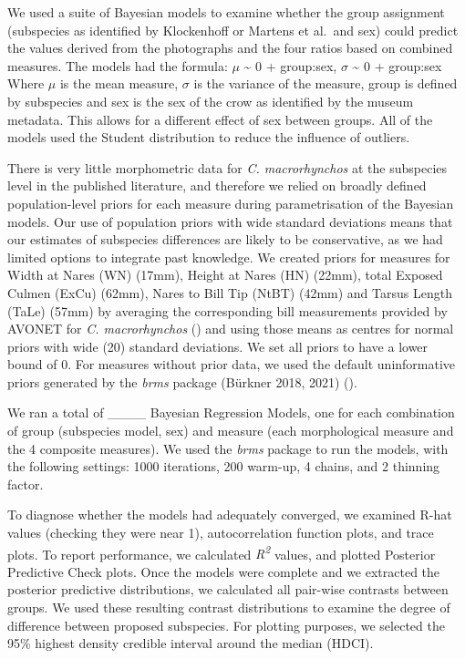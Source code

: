 \documentclass[10pt,a4paper]{article}
\begin{document}
We used a suite of Bayesian models to examine whether the group assignment (subspecies as identified by Klockenhoff or Martens et al.~and sex) could predict the values derived from the photographs and the four ratios based on combined measures.
The models had the formula: \(\mu\) \textasciitilde{} 0 + group:sex, \(\sigma\) \textasciitilde{} 0 + group:sex
Where \(\mu\) is the mean measure, \(\sigma\) is the variance of the measure, group is defined by subspecies and sex is the sex of the crow as identified by the museum metadata.
This allows for a different effect of sex between groups.
All of the models used the Student distribution to reduce the influence of outliers.

There is very little morphometric data for \emph{C. macrorhynchos} at the subspecies level in the published literature, and therefore we relied on broadly defined population-level priors for each measure during parametrisation of the Bayesian models.
Our use of population priors with wide standard deviations means that our estimates of subspecies differences are likely to be conservative, as we had limited options to integrate past knowledge.
We created priors for measures for Width at Nares (WN) (17mm), Height at Nares (HN) (22mm), total Exposed Culmen (ExCu) (62mm), Nares to Bill Tip (NtBT) (42mm) and Tarsus Length (TaLe) (57mm) by averaging the corresponding bill measurements provided by AVONET for \emph{C. macrorhynchos} () and using those means as centres for normal priors with wide (20) standard deviations.
We set all priors to have a lower bound of 0.
For measures without prior data, we used the default uninformative priors generated by the \emph{brms} package (Bürkner 2018, 2021) ().

We ran a total of \_\_\_\_ Bayesian Regression Models, one for each combination of group (subspecies model, sex) and measure (each morphological measure and the 4 composite measures).
We used the \emph{brms} package to run the models, with the following settings: 1000 iterations, 200 warm-up, 4 chains, and 2 thinning factor.

To diagnose whether the models had adequately converged, we examined R-hat values (checking they were near 1), autocorrelation function plots, and trace plots.
To report performance, we calculated \emph{R\textsuperscript{2}} values, and plotted Posterior Predictive Check plots.
Once the models were complete and we extracted the posterior predictive distributions, we calculated all pair-wise contrasts between groups.
We used these resulting contrast distributions to examine the degree of difference between proposed subspecies.
For plotting purposes, we selected the 95\% highest density credible interval around the median (HDCI).
\end{document}
